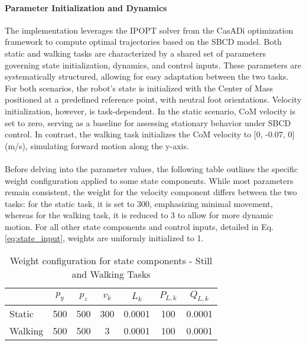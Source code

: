 \documentclass[main.tex]{subfiles}
\begin{document}
\paragraph{Parameter Initialization and Dynamics} The implementation leverages the IPOPT solver from the CasADi optimization framework to compute optimal trajectories based on the SBCD model. Both static and walking tasks are characterized by a shared set of parameters governing state initialization, dynamics, and control inputs. These parameters are systematically structured, allowing for easy adaptation between the two tasks. For both scenarios, the robot’s state is initialized with the Center of Mass positioned at a predefined reference point, with neutral foot orientations. Velocity initialization, however, is task-dependent. In the static scenario, CoM velocity is set to zero, serving as a baseline for assessing stationary behavior under SBCD control. In contrast, the walking task initializes the CoM velocity to [0, -0.07, 0] (m/s), simulating forward motion along the y-axis.\\
\\
Before delving into the parameter values, the following table outlines the specific weight configuration applied to some state components. While most parameters remain consistent, the weight for the velocity component differs between the two tasks: for the static task, it is set to 300, emphasizing minimal movement, whereas for the walking task, it is reduced to 3 to allow for more dynamic motion. For all other state components and control inputs, detailed in Eq. \ref{eq:state_input}, weights are uniformly initialized to 1.
\begin{table}[h!]
    \centering
    \begin{tabular}{lcccccc}
    \toprule
    & $p_y$ & $p_z$ & $v_k$ & $L_k$ & $P_{L,k}$ & $Q_{L,k}$ \\
    \midrule
    Static & 500 & 500 & 300 & 0.0001 & 100 & 0.0001 \\
    Walking & 500 & 500 & 3 & 0.0001 & 100 & 0.0001 \\
    \bottomrule
    \end{tabular}
    \caption{Weight configuration for state components - Still and Walking Tasks}
\end{table}
\end{document}
